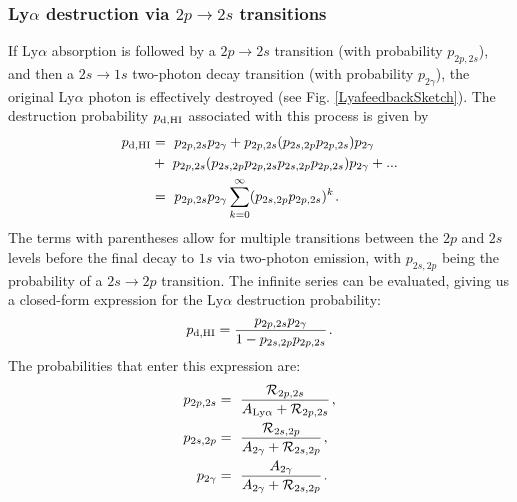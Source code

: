 \documentclass[fleqn,usenatbib]{mnras}
\begin{document}
\subsubsection{Ly$\alpha$ destruction via $2p \rightarrow 2s$ transitions}

If Ly$\alpha$ absorption is followed by a $2p\rightarrow 2s$ transition (with probability $p_{2p,2s}$), and then a $2s \rightarrow 1s$ two-photon decay transition (with probability $p_{2 \gamma}$), the original Ly$\alpha$ photon is effectively destroyed (see Fig. \ref{LyafeedbackSketch}). The destruction probability $p_{\rm d, HI}$ associated with this process is given by
\begin{align}
    p_{\rm d, HI} &=~ p_{2p,2s} p_{2\gamma} + p_{2p,2s}(p_{2s,2p}p_{2p,2s}) p_{2\gamma} \nonumber \\ &+~  p_{2p,2s}(p_{2s,2p}p_{2p,2s}p_{2s,2p}p_{2p,2s}) p_{2\gamma} + ... \nonumber \\ &=~ p_{2p,2s} p_{2\gamma} \sum_{k=0}^{\infty} (p_{2s,2p}p_{2p,2s})^k \hspace{1 pt}.
\end{align}
The terms with parentheses allow for multiple transitions between the $2p$ and $2s$ levels before the final decay to $1s$ via two-photon emission, with $p_{2s,2p}$ being the probability of a $2s \rightarrow 2p$ transition. The infinite series can be evaluated, giving us a closed-form expression for the Ly$\alpha$ destruction probability: 
\begin{equation}
    p_{\rm d, HI} = \frac{p_{2p,2s} p_{2\gamma}}{1 - p_{2s,2p}p_{2p,2s}} \hspace{1 pt} \label{p_d first version}.
\end{equation}
The probabilities that enter this expression are:
\begin{align}
    p_{2p,2s} &=~ \frac{\mathcal{R}_{2p,2s}}{A_{\rm Ly\alpha}+ \mathcal{R}_{2p,2s}} \hspace{1 pt} \label{p_2p2s}, \\ p_{2s,2p} &=~ \frac{\mathcal{R}_{2s,2p}}{A_{2\gamma} + \mathcal{R}_{2s,2p}} \hspace{1 pt} , \label{p_2s2p} \\ p_{2 \gamma} &=~ \frac{A_{2\gamma}}{A_{2\gamma} + \mathcal{R}_{2s,2p}} \hspace{1 pt} \label{p_2phot} .
\end{align}
\end{document}
